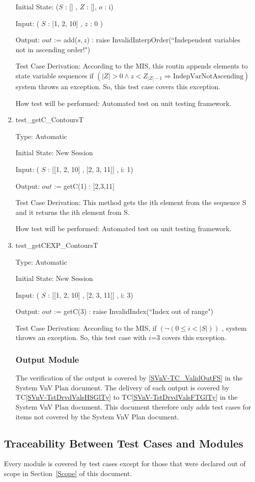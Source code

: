 \documentclass[12pt]{article}
\newcommand{\tcref}[1]{TC\ref{#1}}
\newcounter{utestnum} %
\begin{document}
\begin{enumerate}[label=TC\arabic*:,ref={\arabic*}]
Initial State: ($S$ : [] , $Z$ : [], $o$ : i)

Input: ( $S$ : [1, 2, 10] , $z$ : 0 )

Output: $out$ := add($s, z$) : raise InvalidInterpOrder(``Independent variables not in ascending order!")


Test Case Derivation: According to the MIS, this routin appends elements to state variable sequences if $(|Z| > 0 \wedge z
< Z_{|Z|-1} \Rightarrow \mbox{IndepVarNotAscending})$ system throws an exception. So, this test case covers this exception.

How test will be performed: Automated test on unit testing framework.


\item [TC\refstepcounter{utestnum}\theutestnum: \label{getCContoursTest}] 
test\_getC\_ContoursT

Type: Automatic

Initial State: New Session

Input: ( $S$ : [[1, 2, 10] , [2, 3, 11]] , i: 1)

Output: $out$ := getC(1) : [2,3,11]


Test Case Derivation: This method gets the ith element from the sequence S and it returns the ith element from S.

How test will be performed: Automated test on unit testing framework.

\item [TC\refstepcounter{utestnum}\theutestnum: \label{getCEXPContoursTest}] 
test\_getCEXP\_ContoursT

Type: Automatic

Initial State: New Session

Input: ( $S$ : [[1, 2, 10] , [2, 3, 11]] , i: 3)

Output: $out$ := getC(3) : raise InvalidIndex(``Index out of range")


Test Case Derivation: According to the MIS, if $(\neg(0 \leq i < |S|))$ , system throws an exception. So, this test case with $i$=3 covers this exception.



\subsubsection{Output Module}	

The verification of the output is covered by \ref{SVnV-TC_ValidOutFS} in the 
System VnV Plan document. The delivery of each output is covered by 
\tcref{SVnV-TstDrvdValsHSGlTy} to \tcref{SVnV-TstDrvdValsFTGlTy} in the System VnV Plan 
document. This document therefore only adds test cases for items not covered by 
the System VnV Plan document.


\end{enumerate}

\subsection{Traceability Between Test Cases and Modules}

Every module is covered by test cases except for those that were 
declared out of scope in Section~\ref{Scope} of this document.





\newpage


\end{document}

